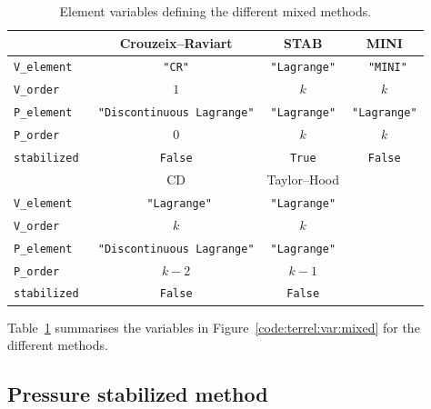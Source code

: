 \begin{table}
\centering
\caption{Element variables defining the different mixed methods.}
\label{tab:terrel:element_vars}
\medskip
\small
\begin{tabular}{|lccc|}
\hline
& Crouzeix--Raviart &  STAB & MINI \\
\hline
{\tt V\_element } & {\tt "CR"} &  {\tt "Lagrange"} & {\tt
 "MINI"}\\
{\tt V\_order} & $1$ & $k$ & $k$ \\
{\tt P\_element } & {\tt "Discontinuous Lagrange"} &  {\tt "Lagrange"} & {\tt "Lagrange"} \\
{\tt P\_order} & $0$ & $k$ & $k$ \\
{\tt stabilized } & {\tt False} & {\tt True} & {\tt False} \\
\hline
\hline
& CD &  Taylor--Hood &\\
\hline
{\tt V\_element } & {\tt
 "Lagrange"} & {\tt "Lagrange"} &\\
{\tt V\_order} & $k$ & $k$ &\\
{\tt P\_element } & {\tt "Discontinuous Lagrange"} & {\tt "Lagrange"} &\\
{\tt P\_order} & $k-2$ & $k-1$ &\\
{\tt stabilized } &  {\tt False} & {\tt False} &\\
\hline
\end{tabular}
\end{table}

Table~\ref{tab:terrel:element_vars} summarises the variables in
Figure~\ref{code:terrel:var:mixed} for the different methods.

\subsection{Pressure stabilized method}

